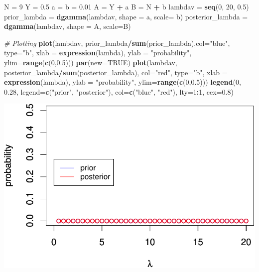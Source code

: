\documentclass[
]{article}
\newenvironment{Shaded}{\begin{snugshade}}{\end{snugshade}}
\newcommand{\CommentTok}[1]{\textcolor[rgb]{0.56,0.35,0.01}{\textit{#1}}}
\newcommand{\DataTypeTok}[1]{\textcolor[rgb]{0.13,0.29,0.53}{#1}}
\newcommand{\DecValTok}[1]{\textcolor[rgb]{0.00,0.00,0.81}{#1}}
\newcommand{\FloatTok}[1]{\textcolor[rgb]{0.00,0.00,0.81}{#1}}
\newcommand{\KeywordTok}[1]{\textcolor[rgb]{0.13,0.29,0.53}{\textbf{#1}}}
\newcommand{\NormalTok}[1]{#1}
\newcommand{\OperatorTok}[1]{\textcolor[rgb]{0.81,0.36,0.00}{\textbf{#1}}}
\newcommand{\OtherTok}[1]{\textcolor[rgb]{0.56,0.35,0.01}{#1}}
\newcommand{\StringTok}[1]{\textcolor[rgb]{0.31,0.60,0.02}{#1}}
\begin{document}
\begin{Shaded}
\begin{Highlighting}[]
\NormalTok{N =}\StringTok{ }\DecValTok{9}
\NormalTok{Y =}\StringTok{ }\FloatTok{0.5}
\NormalTok{a =}\StringTok{ }\NormalTok{b =}\StringTok{ }\FloatTok{0.01}
\NormalTok{A =}\StringTok{ }\NormalTok{Y }\OperatorTok{+}\StringTok{ }\NormalTok{a}
\NormalTok{B =}\StringTok{ }\NormalTok{N }\OperatorTok{+}\StringTok{ }\NormalTok{b}
\NormalTok{lambdav =}\StringTok{ }\KeywordTok{seq}\NormalTok{(}\DecValTok{0}\NormalTok{, }\DecValTok{20}\NormalTok{, }\FloatTok{0.5}\NormalTok{)}
\NormalTok{prior_lambda =}\StringTok{ }\KeywordTok{dgamma}\NormalTok{(lambdav, }\DataTypeTok{shape =}\NormalTok{ a, }\DataTypeTok{scale=}\NormalTok{ b)}
\NormalTok{posterior_lambda =}\StringTok{ }\KeywordTok{dgamma}\NormalTok{(lambdav, }\DataTypeTok{shape =}\NormalTok{ A, }\DataTypeTok{scale=}\NormalTok{B)}

\CommentTok{# Plotting}
\KeywordTok{plot}\NormalTok{(lambdav, prior_lambda}\OperatorTok{/}\KeywordTok{sum}\NormalTok{(prior_lambda),}\DataTypeTok{col=}\StringTok{"blue"}\NormalTok{, }\DataTypeTok{type=}\StringTok{"b"}\NormalTok{, }\DataTypeTok{xlab =} \KeywordTok{expression}\NormalTok{(lambda), }\DataTypeTok{ylab =} \StringTok{"probability"}\NormalTok{, }\DataTypeTok{ylim=}\KeywordTok{range}\NormalTok{(}\KeywordTok{c}\NormalTok{(}\DecValTok{0}\NormalTok{,}\FloatTok{0.5}\NormalTok{)))}
\KeywordTok{par}\NormalTok{(}\DataTypeTok{new=}\OtherTok{TRUE}\NormalTok{)}
\KeywordTok{plot}\NormalTok{(lambdav, posterior_lambda}\OperatorTok{/}\KeywordTok{sum}\NormalTok{(posterior_lambda), }\DataTypeTok{col=}\StringTok{"red"}\NormalTok{, }\DataTypeTok{type=}\StringTok{"b"}\NormalTok{, }\DataTypeTok{xlab =} \KeywordTok{expression}\NormalTok{(lambda), }\DataTypeTok{ylab =} \StringTok{"probability"}\NormalTok{, }\DataTypeTok{ylim=}\KeywordTok{range}\NormalTok{(}\KeywordTok{c}\NormalTok{(}\DecValTok{0}\NormalTok{,}\FloatTok{0.5}\NormalTok{)))}
\KeywordTok{legend}\NormalTok{(}\DecValTok{0}\NormalTok{, }\FloatTok{0.28}\NormalTok{, }\DataTypeTok{legend=}\KeywordTok{c}\NormalTok{(}\StringTok{"prior"}\NormalTok{, }\StringTok{"posterior"}\NormalTok{),}
       \DataTypeTok{col=}\KeywordTok{c}\NormalTok{(}\StringTok{"blue"}\NormalTok{, }\StringTok{"red"}\NormalTok{), }\DataTypeTok{lty=}\DecValTok{1}\OperatorTok{:}\DecValTok{1}\NormalTok{, }\DataTypeTok{cex=}\FloatTok{0.8}\NormalTok{)}
\end{Highlighting}
\end{Shaded}

\includegraphics{STAT_205_HW2_files/figure-latex/unnamed-chunk-5-1.pdf}
\end{document}

